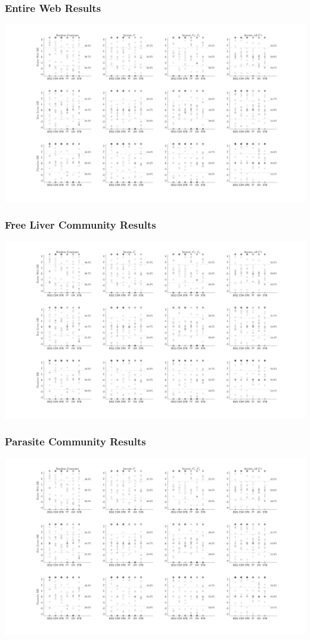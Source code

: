 \documentclass[table]{beamer}
\begin{document}
\begin{frame}
    \frametitle{Entire Web Results}
    \includegraphics[width=\textwidth]{../Chapter3/figures/Properties-Raw.png}
\end{frame}

\begin{frame}
    \frametitle{Free Liver Community Results}
    \includegraphics[width=\textwidth]{../Chapter3/figures/Properties-Raw.png}
\end{frame}

\begin{frame}
    \frametitle{Parasite Community Results}
    \includegraphics[width=\textwidth]{../Chapter3/figures/Properties-Raw.png}
\end{frame}
\end{document}
